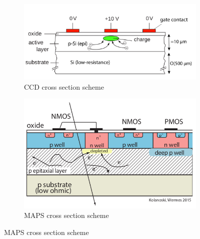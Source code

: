    \begin{figure}
      \centering
      \begin{subfigure}[b]{0.49\textwidth}
          \centering
          \includegraphics[width=\linewidth]{figures/Pixel_detectors/CCD.png}
          \caption{CCD cross section scheme}
          \label{fig:CCD_scheme}
      \end{subfigure}
      \hfill
      \begin{subfigure}[b]{0.49\textwidth}
          \centering
          \includegraphics[width=\linewidth]{figures/Pixel_detectors/MAPS_scheme.png}  
          \caption{MAPS cross section scheme}
          \label{fig:MAPS_scheme}
      \end{subfigure}
   \end{figure}


